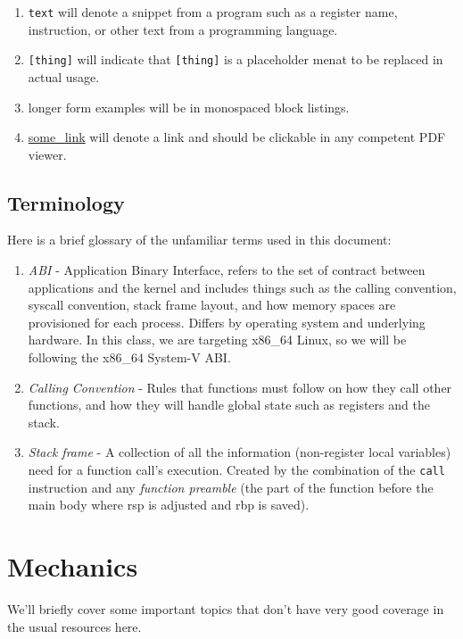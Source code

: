 \documentclass[11pt]{article}
\begin{document}
\begin{enumerate}
    \item \texttt{text} will denote a snippet from a program such as a register name,
        instruction, or other text from a programming language.
    \item \texttt{[thing]} will indicate that \texttt{[thing]} is a placeholder menat to
        be replaced in actual usage.
    \item longer form examples will be in monospaced block listings.
    \item \url{some_link} will denote a link and should be clickable in any competent PDF
        viewer.
\end{enumerate}

\subsection{Terminology}

Here is a brief glossary of the unfamiliar terms used in this document:

\begin{enumerate}
    \item \emph{ABI} - Application Binary Interface, refers to the set of contract between
        applications and the kernel and includes things such as the calling convention,
        syscall convention, stack frame layout, and how memory spaces are provisioned for
        each process. Differs by operating system and underlying hardware. In this class,
        we are targeting x86\_64 Linux, so we will be following the x86\_64 System-V ABI.
    \item \emph{Calling Convention} - Rules that functions must follow on how they call
        other functions, and how they will handle global state such as registers and the
        stack.
    \item \emph{Stack frame} - A collection of all the information (non-register local
        variables) need for a function call's execution. Created by the combination of the
        \texttt{call} instruction and any \emph{function preamble} (the part of the
        function before the main body where rsp is adjusted and rbp is saved).
\end{enumerate}

\section{Mechanics}

We'll briefly cover some important topics that don't have very good coverage in the usual
resources here.
\end{document}
